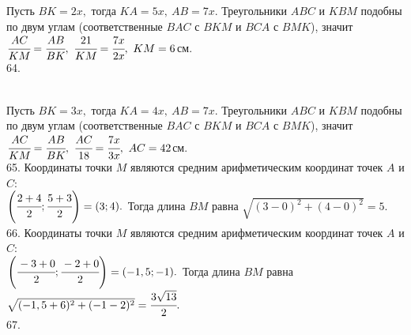 \documentclass[12pt]{article}
\begin{document}
Пусть $BK=2x,$ тогда $KA=5x,\ AB=7x.$ Треугольники $ABC$ и $KBM$ подобны по двум углам (соответственные $BAC$ с $BKM$ и $BCA$ с $BMK$), значит $\cfrac{AC}{KM}=\cfrac{AB}{BK},\ \cfrac{21}{KM}=\cfrac{7x}{2x},\ KM=6$см.\\
64. \begin{figure}[ht!]
\end{figure}\\
Пусть $BK=3x,$ тогда $KA=4x,\ AB=7x.$ Треугольники $ABC$ и $KBM$ подобны по двум углам (соответственные $BAC$ с $BKM$ и $BCA$ с $BMK$), значит $\cfrac{AC}{KM}=\cfrac{AB}{BK},\ \cfrac{AC}{18}=\cfrac{7x}{3x},\ AC=42$см.\\
65. Координаты точки $M$ являются средним арифметическим координат точек $A$ и $C:$\\$ \left(\cfrac{2+4}{2}; \cfrac{5+3}{2}\right)=(3;4).$ Тогда длина $BM$ равна $\sqrt{(3-0)^2+(4-0)^2}=5.$\\
66. Координаты точки $M$ являются средним арифметическим координат точек $A$ и $C:$\\$ \left(\cfrac{-3+0}{2}; \cfrac{-2+0}{2}\right)=(-1,5;-1).$ Тогда длина $BM$ равна $\sqrt{(-1,5+6)^2+(-1-2)^2}=\cfrac{3\sqrt{13}}{2}.$\\
67. \begin{figure}[ht!]
\end{figure}\\
\end{document}
